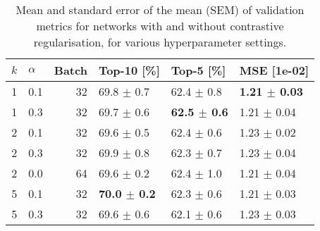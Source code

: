 \begin{table}[h]
\caption{Mean and standard error of the mean (SEM) of validation metrics for networks with and without contrastive regularisation, for various hyperparameter settings.}
\label{tab:cr_32}
\begin{tabular}{rlrlll}
\toprule
$k$ & $\alpha$ & Batch & Top-10 [\%] & Top-5 [\%] & MSE [1e-02] \\
\midrule
1 & 0.1 & 32 & 69.8 $\pm$ 0.7 & 62.4 $\pm$ 0.8 & \textbf{1.21 $\pm$ 0.03} \\
1 & 0.3 & 32 & 69.7 $\pm$ 0.6 & \textbf{62.5 $\pm$ 0.6} & 1.21 $\pm$ 0.04 \\
2 & 0.1 & 32 & 69.6 $\pm$ 0.5 & 62.4 $\pm$ 0.6 & 1.23 $\pm$ 0.02 \\
2 & 0.3 & 32 & 69.9 $\pm$ 0.8 & 62.3 $\pm$ 0.7 & 1.23 $\pm$ 0.04 \\
2 & 0.0 & 64 & 69.6 $\pm$ 0.2 & 62.4 $\pm$ 1.0 & 1.21 $\pm$ 0.04 \\
5 & 0.1 & 32 & \textbf{70.0 $\pm$ 0.2} & 62.3 $\pm$ 0.6 & 1.21 $\pm$ 0.03 \\
5 & 0.3 & 32 & 69.6 $\pm$ 0.6 & 62.1 $\pm$ 0.6 & 1.23 $\pm$ 0.03 \\
\bottomrule
\end{tabular}
\end{table}
